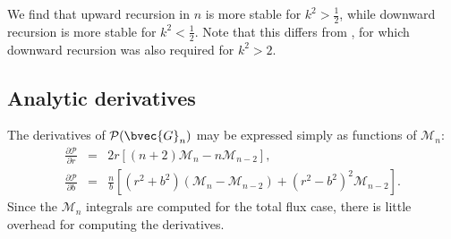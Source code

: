\documentclass[modern,trackchanges]{aastex63}
\begin{document}
We find that upward recursion in $n$ is more stable for $k^2 > \tfrac{1}{2} $,
while downward recursion is more stable for $k^2 < \tfrac{1}{2}$.  Note that
this differs from \citet{starry}, for which downward recursion was also required for $k^2 > 2$.


\subsection{Analytic derivatives}\label{sec:analytic_derivatives}

The derivatives of $\mathcal{P}(\bvec{G}_n)$ may be expressed simply as functions
of $\mathcal{M}_n$:
\begin{eqnarray}
\frac{\partial \mathcal{P}}{\partial r} &=& 2r \left[(n+2)\mathcal{M}_n - n \mathcal{M}_{n-2}\right],\\
\frac{\partial \mathcal{P}}{\partial b} &=& \frac{n}{b} \left[(r^2+b^2)(\mathcal{M}_n - \mathcal{M}_{n-2})+(r^2-b^2)^2\mathcal{M}_{n-2}\right].
\end{eqnarray}
Since the $\mathcal{M}_n$ integrals are computed for the total flux case,
there is little overhead for computing the derivatives.
\end{document}
